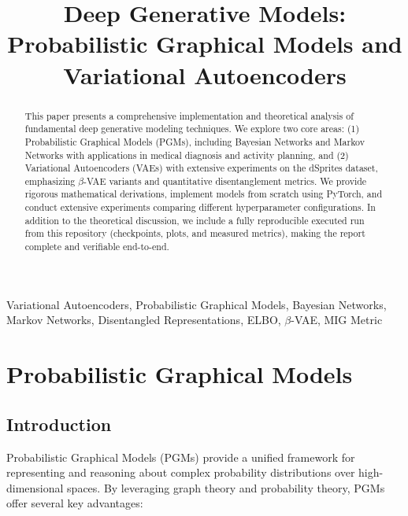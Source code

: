 \documentclass[conference]{IEEEtran}
\begin{document}
\title{Deep Generative Models: Probabilistic Graphical Models and Variational Autoencoders}

\author{
}

\maketitle

\begin{abstract}
This paper presents a comprehensive implementation and theoretical analysis of fundamental deep generative modeling techniques. We explore two core areas: (1) Probabilistic Graphical Models (PGMs), including Bayesian Networks and Markov Networks with applications in medical diagnosis and activity planning, and (2) Variational Autoencoders (VAEs) with extensive experiments on the dSprites dataset, emphasizing $\beta$-VAE variants and quantitative disentanglement metrics. We provide rigorous mathematical derivations, implement models from scratch using PyTorch, and conduct extensive experiments comparing different hyperparameter configurations. In addition to the theoretical discussion, we include a fully reproducible executed run from this repository (checkpoints, plots, and measured metrics), making the report complete and verifiable end-to-end.
\end{abstract}

\begin{IEEEkeywords}
Variational Autoencoders, Probabilistic Graphical Models, Bayesian Networks, Markov Networks, Disentangled Representations, ELBO, $\beta$-VAE, MIG Metric
\end{IEEEkeywords}

\section{Probabilistic Graphical Models}

\subsection{Introduction}

Probabilistic Graphical Models (PGMs) provide a unified framework for representing and reasoning about complex probability distributions over high-dimensional spaces. By leveraging graph theory and probability theory, PGMs offer several key advantages:
\end{document}
